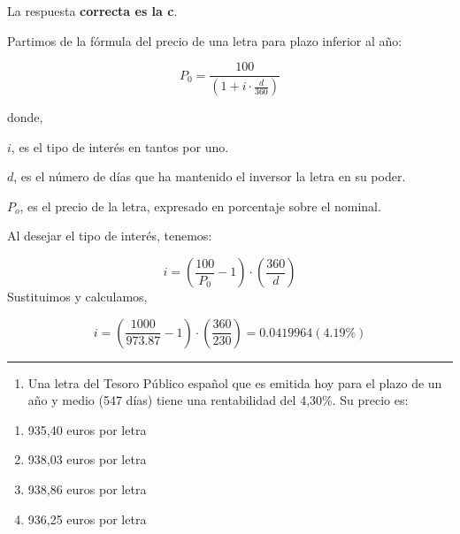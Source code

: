 \documentclass[
  letterpaper,
  DIV=11,
  numbers=noendperiod]{scrreprt}
\providecommand{\tightlist}{%
  \setlength{\itemsep}{0pt}\setlength{\parskip}{0pt}}\usepackage{longtable,booktabs,array}
\begin{document}
\begin{tcolorbox}[enhanced jigsaw, left=2mm, opacityback=0, colback=white, breakable, arc=.35mm, bottomrule=.15mm, rightrule=.15mm, toprule=.15mm, leftrule=.75mm, colframe=quarto-callout-tip-color-frame]
\begin{minipage}[t]{5.5mm}
\textcolor{quarto-callout-tip-color}{\faLightbulb}
\end{minipage}%
\begin{minipage}[t]{\textwidth - 5.5mm}

La respuesta \textbf{correcta es la c}.

Partimos de la fórmula del precio de una letra para plazo inferior al
año:

\[P_0=\frac{100}{\left(1+i\cdot\frac{d}{360}\right)}\]

donde,

\(i\), es el tipo de interés en tantos por uno.

\(d\), es el número de días que ha mantenido el inversor la letra en su
poder.

\(P_o\), es el precio de la letra, expresado en porcentaje sobre el
nominal.

Al desejar el tipo de interés, tenemos:

\[i=\left(\frac{100}{P_0}-1\right)\cdot{\left(\frac{360}{d}\right)}\]
Sustituimos y calculamos,

\[i=\left(\frac{1000}{973.87}-1\right)\cdot{\left(\frac{360}{230}\right)}=0.0419964(4.19\%)\]

\end{minipage}%
\end{tcolorbox}

\begin{center}\rule{0.5\linewidth}{0.5pt}\end{center}

\begin{enumerate}
\def\labelenumi{\arabic{enumi}.}
\setcounter{enumi}{8}
\tightlist
\item
  Una letra del Tesoro Público español que es emitida hoy para el plazo
  de un año y medio (547 días) tiene una rentabilidad del 4,30\%. Su
  precio es:
\end{enumerate}

\begin{enumerate}
\def\labelenumi{\alph{enumi}.}
\item
  935,40 euros por letra
\item
  938,03 euros por letra
\item
  938,86 euros por letra
\item
  936,25 euros por letra
\end{enumerate}
\end{document}
